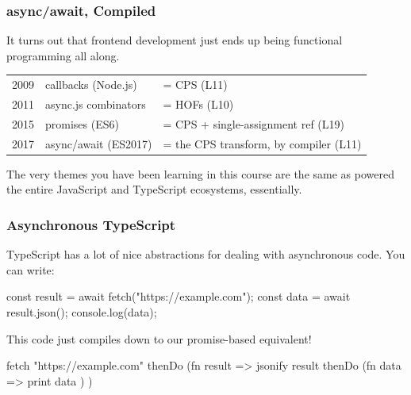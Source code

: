 \documentclass[aspectratio=169]{beamer}
\begin{document}
\begin{frame}[fragile]
  \frametitle{async/await, Compiled}


  It turns out that frontend development just ends up being
  functional programming all along.

  \pause
  \vspace{\fill}

  \begin{center}
  \begin{tabular}{lll}
    2009 & callbacks (Node.js) & = CPS \hfill (L11) \\
    2011 & async.js combinators & = HOFs \hfill (L10) \\
    2015 & promises (ES6) & = CPS + single-assignment ref \hfill (L19) \\
    2017 & async/await (ES2017) & = the CPS transform, by compiler \hfill (L11) \\
  \end{tabular}
  \end{center}

  \pause
  \vspace{\fill}

  The very themes you have been learning in this course are the same
  as powered the entire JavaScript and TypeScript ecosystems,
  essentially.
\end{frame}


\begin{frame}[fragile]
  \frametitle{Asynchronous TypeScript}

  TypeScript has a lot of nice abstractions for dealing with
  asynchronous code. You can write:

  \begin{codeblock}
    const result = await fetch("https://example.com");
    const data = await result.json();
    console.log(data);
  \end{codeblock}

  \pause
  \vspace{\fill}

  This code just compiles down to our promise-based equivalent!
  \begin{codeblock}
    fetch "https://example.com" thenDo (fn result =>
      jsonify result thenDo (fn data =>
        print data
      )
    )
  \end{codeblock}
\end{frame}
\end{document}
